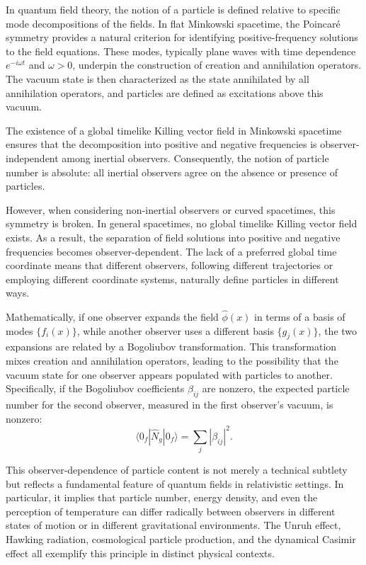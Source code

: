 In quantum field theory, the notion of a particle is defined relative to specific mode decompositions of the fields. In flat Minkowski spacetime, the Poincaré symmetry provides a natural criterion for identifying positive-frequency solutions to the field equations. These modes, typically plane waves with time dependence $e^{-i\omega t}$ and $\omega > 0$, underpin the construction of creation and annihilation operators. The vacuum state is then characterized as the state annihilated by all annihilation operators, and particles are defined as excitations above this vacuum.

The existence of a global timelike Killing vector field in Minkowski spacetime ensures that the decomposition into positive and negative frequencies is observer-independent among inertial observers. Consequently, the notion of particle number is absolute: all inertial observers agree on the absence or presence of particles.

However, when considering non-inertial observers or curved spacetimes, this symmetry is broken. In general spacetimes, no global timelike Killing vector field exists. As a result, the separation of field solutions into positive and negative frequencies becomes observer-dependent. The lack of a preferred global time coordinate means that different observers, following different trajectories or employing different coordinate systems, naturally define particles in different ways.

Mathematically, if one observer expands the field $\hat{\phi}(x)$ in terms of a basis of modes $\{f_i(x)\}$, while another observer uses a different basis $\{g_j(x)\}$, the two expansions are related by a Bogoliubov transformation. This transformation mixes creation and annihilation operators, leading to the possibility that the vacuum state for one observer appears populated with particles to another. Specifically, if the Bogoliubov coefficients $\beta_{ij}$ are nonzero, the expected particle number for the second observer, measured in the first observer's vacuum, is nonzero:
\[
\langle 0_f | \hat{N}_g | 0_f \rangle = \sum_j |\beta_{ij}|^2.
\]

This observer-dependence of particle content is not merely a technical subtlety but reflects a fundamental feature of quantum fields in relativistic settings. In particular, it implies that particle number, energy density, and even the perception of temperature can differ radically between observers in different states of motion or in different gravitational environments. The Unruh effect, Hawking radiation, cosmological particle production, and the dynamical Casimir effect all exemplify this principle in distinct physical contexts.


